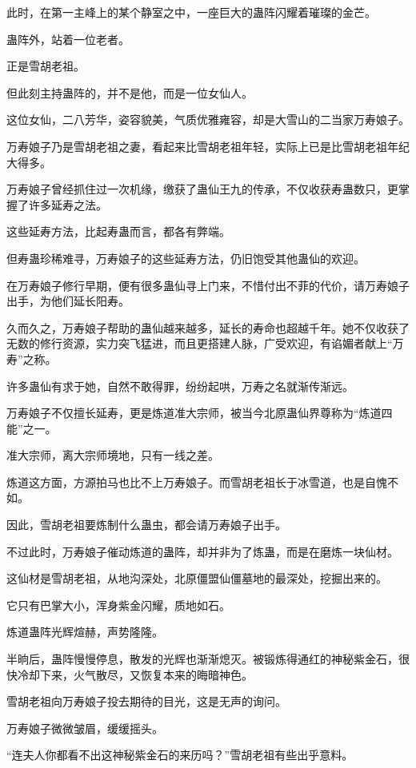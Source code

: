 \begin{this_body}
此时，在第一主峰上的某个静室之中，一座巨大的蛊阵闪耀着璀璨的金芒。

蛊阵外，站着一位老者。

正是雪胡老祖。

但此刻主持蛊阵的，并不是他，而是一位女仙人。

这位女仙，二八芳华，姿容貌美，气质优雅雍容，却是大雪山的二当家万寿娘子。

万寿娘子乃是雪胡老祖之妻，看起来比雪胡老祖年轻，实际上已是比雪胡老祖年纪大得多。

万寿娘子曾经抓住过一次机缘，缴获了蛊仙王九的传承，不仅收获寿蛊数只，更掌握了许多延寿之法。

这些延寿方法，比起寿蛊而言，都各有弊端。

但寿蛊珍稀难寻，万寿娘子的这些延寿方法，仍旧饱受其他蛊仙的欢迎。

在万寿娘子修行早期，便有很多蛊仙寻上门来，不惜付出不菲的代价，请万寿娘子出手，为他们延长阳寿。

久而久之，万寿娘子帮助的蛊仙越来越多，延长的寿命也超越千年。她不仅收获了无数的修行资源，实力突飞猛进，而且更搭建人脉，广受欢迎，有谄媚者献上“万寿”之称。

许多蛊仙有求于她，自然不敢得罪，纷纷起哄，万寿之名就渐传渐远。

万寿娘子不仅擅长延寿，更是炼道准大宗师，被当今北原蛊仙界尊称为“炼道四能”之一。

准大宗师，离大宗师境地，只有一线之差。

炼道这方面，方源拍马也比不上万寿娘子。而雪胡老祖长于冰雪道，也是自愧不如。

因此，雪胡老祖要炼制什么蛊虫，都会请万寿娘子出手。

不过此时，万寿娘子催动炼道的蛊阵，却并非为了炼蛊，而是在磨炼一块仙材。

这仙材是雪胡老祖，从地沟深处，北原僵盟仙僵墓地的最深处，挖掘出来的。

它只有巴掌大小，浑身紫金闪耀，质地如石。

炼道蛊阵光辉煊赫，声势隆隆。

半晌后，蛊阵慢慢停息，散发的光辉也渐渐熄灭。被锻炼得通红的神秘紫金石，很快冷却下来，火气散尽，又恢复本来的晦暗神色。

雪胡老祖向万寿娘子投去期待的目光，这是无声的询问。

万寿娘子微微皱眉，缓缓摇头。

“连夫人你都看不出这神秘紫金石的来历吗？”雪胡老祖有些出乎意料。


\end{this_body}
